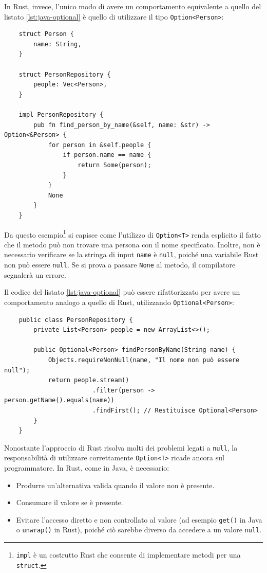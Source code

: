 In Rust, invece, l'unico modo di avere un comportamento equivalente a quello del listato \ref{lst:java-optional} è quello di utilizzare il tipo \texttt{Option<Person>}:
\begin{verbatim}
    struct Person {
        name: String,
    }

    struct PersonRepository {
        people: Vec<Person>,
    }

    impl PersonRepository {
        pub fn find_person_by_name(&self, name: &str) -> Option<&Person> {
            for person in &self.people {
                if person.name == name {
                    return Some(person); 
                }
            }
            None
        }
    }
\end{verbatim}
Da questo esempio\footnote{\texttt{impl} è un costrutto Rust che consente di implementare metodi per una \texttt{struct}.} si capisce come l'utilizzo di \texttt{Option<T>} renda esplicito il fatto che il metodo può non trovare una persona con il nome specificato. Inoltre, non è necessario verificare se la stringa di input \texttt{name} è \texttt{null}, poiché una variabile Rust non può essere \texttt{null}. Se si prova a passare \texttt{None} al metodo, il compilatore segnalerà un errore.

Il codice del listato \ref{lst:java-optional} può essere rifattorizzato per avere un comportamento analogo a quello di Rust, utilizzando \texttt{Optional<Person>}:
\begin{verbatim}
    public class PersonRepository {
        private List<Person> people = new ArrayList<>();

        public Optional<Person> findPersonByName(String name) {
            Objects.requireNonNull(name, "Il nome non può essere null");
            return people.stream()
                        .filter(person -> person.getName().equals(name))
                        .findFirst(); // Restituisce Optional<Person>
        }
    }
\end{verbatim}
Nonostante l'approccio di Rust risolva molti dei problemi legati a \texttt{null}, la responsabilità di utilizzare correttamente \texttt{Option<T>} ricade ancora sul programmatore. In Rust, come in Java, è necessario:
\begin{itemize}
    \item Produrre un'alternativa valida quando il valore non è presente. 
    \item Consumare il valore se è presente. 
    \item Evitare l'accesso diretto  e non controllato al valore (ad esempio \texttt{get()} in Java o \texttt{unwrap()} in Rust), poiché ciò sarebbe diverso da accedere a un valore \texttt{null}.
\end{itemize}


